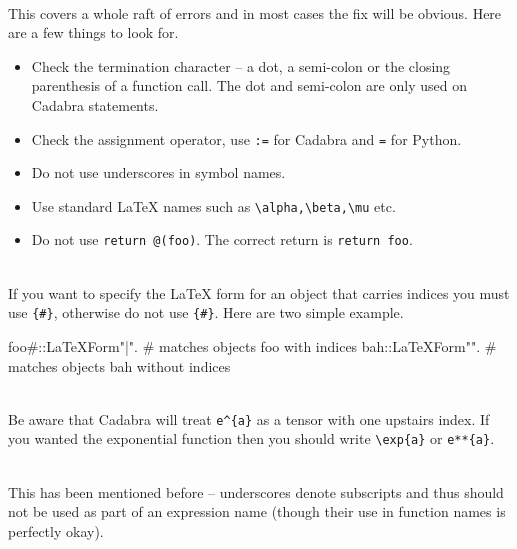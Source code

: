 \documentclass[a4paper,12pt]{article}
\numberwithin{equation}{section}%
\begin{document}
\begin{enumerate}

   \\[5pt]
   This covers a whole raft of errors and in most cases the fix will be obvious. Here are a few
   things to look for.
   \begin{itemize}
      \item Check the termination character -- a dot, a semi-colon or the closing parenthesis
            of a function call. The dot and semi-colon are only used on Cadabra statements.
      \item Check the assignment operator, use \verb|:=| for Cadabra and \verb|=| for Python.
      \item Do not use underscores in symbol names.
      \item Use standard LaTeX names such as \verb|\alpha,\beta,\mu| etc.
      \item Do not use \verb|return @(foo)|. The correct return is \verb|return foo|.
   \end{itemize}

   \\[5pt]
   If you want to specify the LaTeX form for an object that carries indices you
   must use \verb|{#}|, otherwise do not use \verb|{#}|. Here are two simple example.
   \begin{cadabra}
      foo{#}::LaTeXForm{"{\bar \alpha}"}.    # matches objects foo with indices
      bah::LaTeXForm{"{\hat \beta}"}.        # matches objects bah without indices
   \end{cadabra}

   \\[5pt]
   Be aware that Cadabra will treat \verb|e^{a}| as a tensor with one upstairs index. If you
   wanted the exponential function then you should write \verb|\exp{a}| or \verb|e**{a}|.

   \\[5pt]
   This has been mentioned before -- underscores denote subscripts and thus should
   not be used as part of an expression name (though their use in function names is
   perfectly okay).


\end{enumerate}
\end{document}
